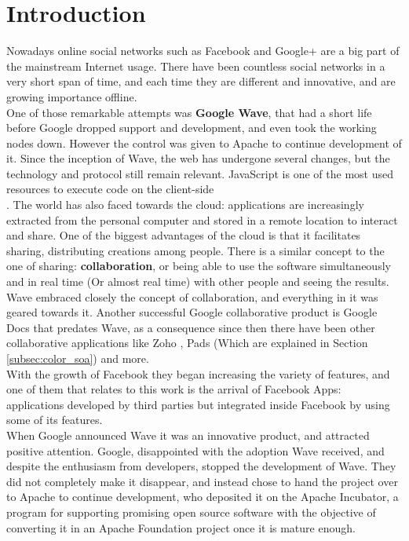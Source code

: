 \newpage
\thispagestyle{sectioned}
\chapter{Introduction}
Nowadays online social networks such as Facebook and Google+ are a big part of the mainstream Internet usage. There have been countless social networks in a very short span of time, and each time they are different and innovative, and are growing importance offline.\\[.2cm]
One of those remarkable attempts was \textbf{Google Wave}, that had a short life before Google dropped support and development, and even took the working nodes down. However the control was given to Apache to continue development of it. Since the inception of Wave, the web has undergone several changes, but the technology and protocol still remain relevant. JavaScript is one of the most used resources to execute code on the client-side\\[.2cm].
The world has also faced towards the cloud: applications are increasingly extracted from the personal computer and stored in a remote location to interact and share. One of the biggest advantages of the cloud is that it facilitates sharing, distributing creations among people. There is a similar concept to the one of sharing: \textbf{collaboration}, or being able to use the software simultaneously and in real time (Or almost real time) with other people and seeing the results. Wave embraced closely the concept of collaboration, and everything in it was geared towards it. Another successful Google collaborative product is Google Docs \cite{ref:google_docs} that predates Wave, as a consequence since then there have been other collaborative applications like Zoho \cite{ref:zoho}, Pads (Which are explained in Section \ref{subsec:color_soa}) and more.\\[.2cm]
With the growth of Facebook they began increasing the variety of features, and one of them that relates to this work is the arrival of Facebook Apps: applications developed by third parties but integrated inside Facebook by using some of its features.\\[.2cm]
When Google announced Wave it was an innovative product, and attracted positive attention. Google, disappointed with the adoption Wave received, and despite the enthusiasm from developers, stopped the development of Wave. They did not completely make it disappear, and instead chose to hand the project over to Apache to continue development, who deposited it on the Apache Incubator, a program for supporting promising open source software with the objective of converting it in an Apache Foundation project once it is mature enough.\\[.2cm]
